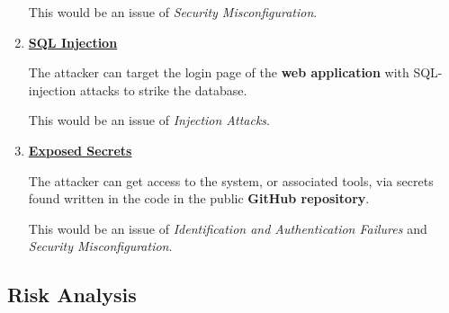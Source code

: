 \begin{enumerate}
    This would be an issue of \textit{Security Misconfiguration}.
    \item \textbf{\underline{SQL Injection}}

    The attacker can target the login page of the \textbf{web application} with SQL-injection attacks to strike the database.

    This would be an issue of \textit{Injection Attacks}.
    \item \textbf{\underline{Exposed Secrets}}

    The attacker can get access to the system, or associated tools, via secrets found written in the code in the public \textbf{GitHub repository}.

    This would be an issue of \textit{Identification and Authentication Failures} and \textit{Security Misconfiguration}.
\end{enumerate}
\subsection{Risk Analysis}
